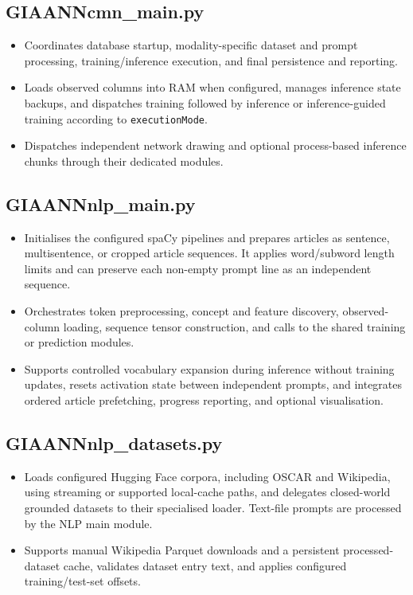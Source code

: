 \subsection{GIAANNcmn\_main.py}
\begin{itemize}
	\item Coordinates database startup, modality-specific dataset and prompt processing, training/inference execution, and final persistence and reporting.
	\item Loads observed columns into RAM when configured, manages inference state backups, and dispatches training followed by inference or inference-guided training according to \texttt{executionMode}.
	\item Dispatches independent network drawing and optional process-based inference chunks through their dedicated modules.
\end{itemize}

\subsection{GIAANNnlp\_main.py}
\begin{itemize}
	\item Initialises the configured spaCy pipelines and prepares articles as sentence, multisentence, or cropped article sequences. It applies word/subword length limits and can preserve each non-empty prompt line as an independent sequence.
	\item Orchestrates token preprocessing, concept and feature discovery, observed-column loading, sequence tensor construction, and calls to the shared training or prediction modules.
	\item Supports controlled vocabulary expansion during inference without training updates, resets activation state between independent prompts, and integrates ordered article prefetching, progress reporting, and optional visualisation.
\end{itemize}

\subsection{GIAANNnlp\_datasets.py}
\begin{itemize}
	\item Loads configured Hugging Face corpora, including OSCAR and Wikipedia, using streaming or supported local-cache paths, and delegates closed-world grounded datasets to their specialised loader. Text-file prompts are processed by the NLP main module.
	\item Supports manual Wikipedia Parquet downloads and a persistent processed-dataset cache, validates dataset entry text, and applies configured training/test-set offsets.
\end{itemize}

